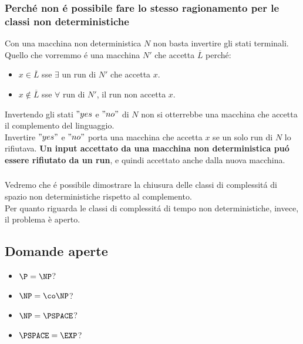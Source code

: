\subsubsection{Perché non é possibile fare lo stesso ragionamento per le classi non deterministiche}
Con una macchina non deterministica $N$ non basta invertire gli stati terminali. \\
Quello che vorremmo é una macchina $N'$ che accetta $\overline{L}$ perché:
\begin{itemize}
\item $x \in \overline{L}$ sse $\exists$ un run di $N'$ che accetta $x$.
\item $x \notin \overline{L}$ sse $\forall$ run di $N'$, il run non accetta $x$.
\end{itemize}
Invertendo gli stati $"yes$ e $"no"$ di $N$ non si otterrebbe una macchina che accetta il complemento del linguaggio. \\ 
Invertire $"yes"$ e $"no"$ porta una macchina che accetta $x$ se un solo run di $N$ lo rifiutava. 
\textbf{Un input accettato da una macchina non deterministica puó essere rifiutato da un run}, e quindi accettato anche dalla nuova macchina.
\subsubsection*{}
Vedremo che é possibile dimostrare la chiusura delle classi di complessitá di spazio non deterministiche rispetto al complemento. \\
Per quanto riguarda le classi di complessitá di tempo non deterministiche, invece, il problema è aperto. \\

\subsection{Domande aperte}
\begin{itemize}
    \item $\P = \NP$?
    \item $\NP = \co\NP$?
    \item $\NP = \PSPACE$?
    \item $\PSPACE = \EXP$?
\end{itemize}
